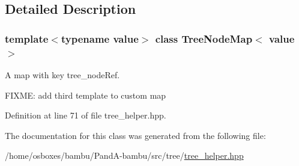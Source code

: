 \subsection{Detailed Description}
\subsubsection*{template$<$typename value$>$\newline
class Tree\+Node\+Map$<$ value $>$}

A map with key tree\+\_\+node\+Ref. 

F\+I\+X\+ME\+: add third template to custom map 

Definition at line 71 of file tree\+\_\+helper.\+hpp.



The documentation for this class was generated from the following file\+:\begin{DoxyCompactItemize}
\item 
/home/osboxes/bambu/\+Pand\+A-\/bambu/src/tree/\hyperlink{tree__helper_8hpp}{tree\+\_\+helper.\+hpp}\end{DoxyCompactItemize}
